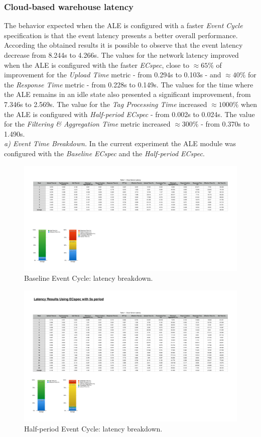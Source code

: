 \subsubsection{Cloud-based warehouse latency}
\label{subs:eval_exp_latency_ecspec_fast}
The behavior expected when the \gls{ALE} is configured with a faster \textit{Event Cycle} specification
is that the event latency presents a better overall performance. According the obtained results it is possible
to observe that the event latency decrease from 8.244s to 4.266s. The values for the network latency
improved when the \gls{ALE} is configured with the faster \textit{ECspec}, close to $\approx65\%$ of
improvement for the \textit{Upload Time} metric - from 0.294s to 0.103s - and $\approx40\%$ for the
\textit{Response Time} metric - from 0.228s to 0.149s. The values for the time where the \gls{ALE}
remains in an idle state also presented a significant improvement, from 7.346s to 2.569s. The value
for the \textit{Tag Processing Time} increased $\approx1000\%$ when the \gls{ALE} is configured with
\textit{Half-period ECspec} - from 0.002s to 0.024s. The value for the \textit{Filtering \& Aggregation Time}
metric increased $\approx300\%$ - from 0.370s to 1.490s.\\

\textit{a) Event Time Breakdown.}
In the current experiment the \gls{ALE} module was configured with the \textit{Baseline ECspec} and
the \textit{Half-period ECspec}.\\

\begin{figure}[ht!]
  \centering
  \includegraphics[width=.55\linewidth]{./figures/cloud_ecspec_breakdown}
  \caption{Baseline Event Cycle: latency breakdown.}
  \label{fig:ecspecf_base}
\end{figure}

\begin{figure}[ht!]
  \centering
  \includegraphics[width=.55\linewidth]{./figures/cloud_ecspecf_breakdown}
  \caption{Half-period Event Cycle: latency breakdown.}
  \label{fig:ecspecf_half}
\end{figure}

